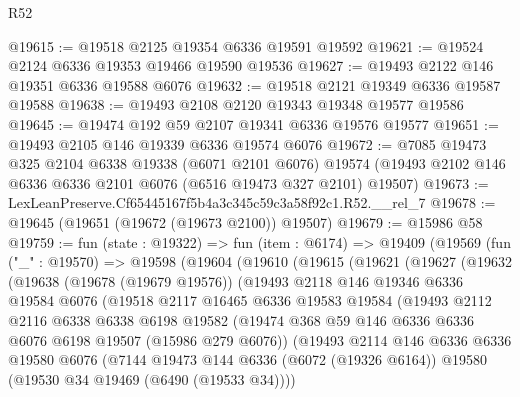 \begin{lexlean}{R52}
\begin{coremodule}
@19615 := @19518 @2125 @19354 @6336 @19591 @19592
@19621 := @19524 @2124 @6336 @19353 @19466 @19590 @19536
@19627 := @19493 @2122 @146 @19351 @6336 @19588 @6076
@19632 := @19518 @2121 @19349 @6336 @19587 @19588
@19638 := @19493 @2108 @2120 @19343 @19348 @19577 @19586
@19645 := @19474 @192 @59 @2107 @19341 @6336 @19576 @19577
@19651 := @19493 @2105 @146 @19339 @6336 @19574 @6076
@19672 := @7085
    @19473
    @325
    @2104
    @6338
    @19338
    (@6071 @2101 @6076)
    @19574
    (@19493 @2102 @146 @6336 @6336 @2101 @6076 (@6516 @19473 @327 @2101) @19507)
@19673 := LexLeanPreserve.Cf65445167f5b4a3c345c59c3a58f92c1.R52.__rel_7
@19678 := @19645 (@19651 (@19672 (@19673 @2100)) @19507)
@19679 := @15986 @58
@19759 := fun (state : @19322) =>
  fun (item : @6174) =>
  @19409
    (@19569
      (fun ("_" : @19570) =>
      @19598
        (@19604
          (@19610
            (@19615
              (@19621
                (@19627
                  (@19632
                    (@19638
                      (@19678 (@19679 @19576))
                      (@19493
                        @2118
                        @146
                        @19346
                        @6336
                        @19584
                        @6076
                        (@19518
                          @2117
                          @16465
                          @6336
                          @19583
                          @19584
                          (@19493
                            @2112
                            @2116
                            @6338
                            @6338
                            @6198
                            @19582
                            (@19474
                              @368
                              @59
                              @146
                              @6336
                              @6336
                              @6076
                              @6198
                              @19507
                              (@15986 @279 @6076))
                            (@19493
                              @2114
                              @146
                              @6336
                              @6336
                              @19580
                              @6076
                              (@7144
                                @19473
                                @144
                                @6336
                                (@6072 (@19326 @6164))
                                @19580
                                (@19530 @34 @19469 (@6490 (@19533 @34))))

\end{coremodule}
\end{lexlean}

